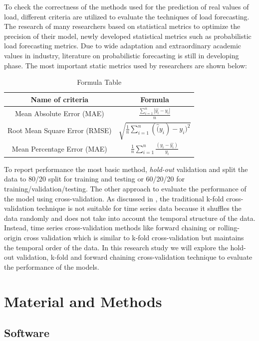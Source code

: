 \documentclass[mstat,12pt]{unswthesis}
\begin{document}
To check the correctness of the methods used for the prediction of real
values of load, different criteria are utilized to evaluate the
techniques of load forecasting. The research of many researchers based
on statistical metrics to optimize the precision of their model, newly
developed statistical metrics such as probabilistic load forecasting
metrics. Due to wide adaptation and extraordinary academic values in
industry, literature on probabilistic forecasting is still in developing
phase. The most important static metrics used by researchers are shown
below:

\begin{table}[h]
\centering
\caption{Formula Table}
\begin{tabular}{|c|c|}
\hline
\textbf{Name of criteria} & \textbf{Formula} \\ 
\hline
Mean Absolute Error (MAE) & $\frac{\sum_{i=1}^n|\hat{y_i}-y_i|}{n}$ \\ 
\hline
Root Mean Square Error (RMSE) & $\sqrt{\frac{1}{n}\sum_{i=1}^{n}(\hat(y_i) - y_i)^2}$ \\ 
\hline
Mean Percentage Error (MAE) & $\frac{1}{n}\sum_{i=1}^{n}\frac{(y_i-\hat{y_i})}{y_i}$ \\ 
\hline
\end{tabular}
\end{table}

To report performance the most basic method, \emph{hold-out} validation
and split the data to 80/20 split for training and testing or 60/20/20
for training/validation/testing. The other approach to evaluate the
performance of the model using cross-validation. As discussed in
\cite{rafferty2023forecasting}, the traditional k-fold cross-validation
technique is not suitable for time series data because it shuffles the
data randomly and does not take into account the temporal structure of
the data. Instead, time series cross-validation methods like forward
chaining or rolling-origin cross validation which is similar to k-fold
cross-validation but maintains the temporal order of the data. In this
research study we will explore the hold-out validation, k-fold and
forward chaining cross-validation technique to evaluate the performance
of the models.

\chapter{Material and Methods}\label{material-and-methods}

\section{Software}\label{software}
\end{document}
